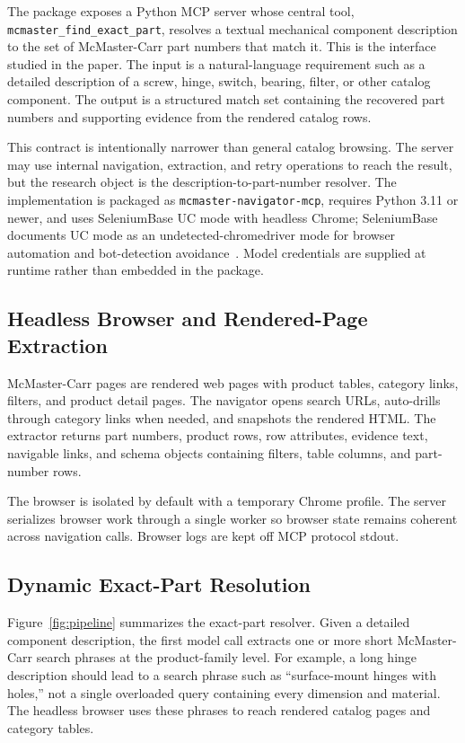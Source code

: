 \documentclass[colorlinks,upint,subscriptcorrection,varvw,hyphenate,balance,nofoot]{asmeconf}
\newcommand{\tool}[1]{\texttt{#1}}
\begin{document}
The package exposes a Python MCP server whose central tool, \tool{mcmaster\_find\_exact\_part}, resolves a textual mechanical component description to the set of McMaster-Carr part numbers that match it. This is the interface studied in the paper. The input is a natural-language requirement such as a detailed description of a screw, hinge, switch, bearing, filter, or other catalog component. The output is a structured match set containing the recovered part numbers and supporting evidence from the rendered catalog rows.

This contract is intentionally narrower than general catalog browsing. The server may use internal navigation, extraction, and retry operations to reach the result, but the research object is the description-to-part-number resolver. The implementation is packaged as \tool{mcmaster-navigator-mcp}, requires Python 3.11 or newer, and uses SeleniumBase UC mode with headless Chrome; SeleniumBase documents UC mode as an undetected-chromedriver mode for browser automation and bot-detection avoidance~\cite{seleniumbaseuc}. Model credentials are supplied at runtime rather than embedded in the package.

\subsection{Headless Browser and Rendered-Page Extraction}

McMaster-Carr pages are rendered web pages with product tables, category links, filters, and product detail pages. The navigator opens search URLs, auto-drills through category links when needed, and snapshots the rendered HTML. The extractor returns part numbers, product rows, row attributes, evidence text, navigable links, and schema objects containing filters, table columns, and part-number rows.

The browser is isolated by default with a temporary Chrome profile. The server serializes browser work through a single worker so browser state remains coherent across navigation calls. Browser logs are kept off MCP protocol stdout.

\subsection{Dynamic Exact-Part Resolution}

Figure~\ref{fig:pipeline} summarizes the exact-part resolver. Given a detailed component description, the first model call extracts one or more short McMaster-Carr search phrases at the product-family level. For example, a long hinge description should lead to a search phrase such as ``surface-mount hinges with holes,'' not a single overloaded query containing every dimension and material. The headless browser uses these phrases to reach rendered catalog pages and category tables.
\end{document}
